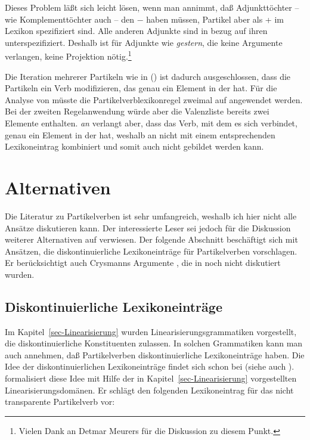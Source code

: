 Dieses Problem läßt sich leicht lösen,
wenn man annimmt, daß Adjunkttöchter -- wie Komplementtöchter auch -- den \lexw{} $-$ haben
müssen, Partikel aber als \lex+ im Lexikon spezifiziert sind. Alle anderen Adjunkte
sind in bezug auf ihren \lexw unterspezifiziert. Deshalb ist für Adjunkte wie \emph{gestern},
die keine Argumente verlangen, keine Projektion nötig.\footnote{
        Vielen Dank an Detmar Meurers für die Diskussion zu diesem Punkt.%
}

Die Iteration mehrerer Partikeln wie in () ist dadurch ausgeschlossen, dass die Partikeln ein
Verb modifizieren, das genau ein Element in der \subcatl hat.
\z
Für die Analyse von  müsste die Partikelverblexikonregel zweimal auf 
angewendet werden. Bei der zweiten Regelanwendung würde aber die Valenzliste bereits zwei Elemente
enthalten. \emph{an} verlangt aber, dass das Verb, mit dem es sich verbindet, genau ein Element in
der \subcatl hat, weshalb an nicht mit einem entsprechenden Lexikoneintrag kombiniert und
 somit auch nicht gebildet werden kann.

\section{Alternativen}

Die Literatur zu Partikelverben ist sehr umfangreich, weshalb ich hier nicht alle Ansätze diskutieren
kann. Der interessierte Leser sei jedoch für die Diskussion weiterer Alternativen auf
 verwiesen. Der folgende Abschnitt beschäftigt sich mit
Ansätzen, die diskontinuierliche Lexikoneinträge für Partikelverben vorschlagen. Er berücksichtigt
auch Crysmanns Argumente \citeyearpar{Crysmann2002a}, die in  noch nicht
diskutiert wurden.

\subsection{Diskontinuierliche Lexikoneinträge}
\label{sec-disc-entry}

Im Kapitel~\ref{sec-Linearisierung} wurden Linearisierungsgrammatiken vorgestellt, die
diskontinuierliche Konstituenten zulassen. In solchen Grammatiken kann man auch annehmen,
daß Partikelverben diskontinuierliche Lexikoneinträge haben. Die Idee der diskontinuierlichen
Lexikoneinträge findet sich schon bei \citet[]{Wells47a} (siehe auch ).
\citet*[--248]{Kathol95a} formalisiert diese Idee mit Hilfe
der in Kapitel~\ref{sec-Linearisierung} vorgestellten Linearisierungsdomänen.
Er schlägt den folgenden Lexikoneintrag für das nicht transparente Partikelverb  
vor:

